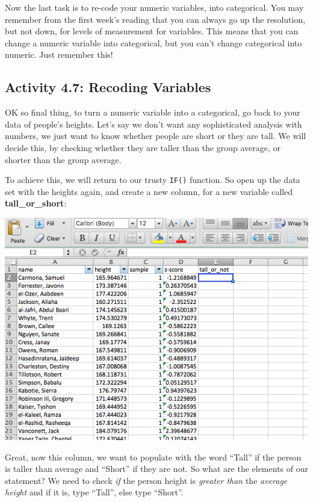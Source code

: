 \documentclass[
]{book}
\begin{document}
Now the last task is to re-code your numeric variables, into categorical. You may remember from the first week's reading that you can always go up the resolution, but not down, for levels of measurement for variables. This means that you can change a numeric variable into categorical, but you can't change categorical into numeric. Just remember this!

\hypertarget{activity-4.7-recoding-variables}{%
\subsection{Activity 4.7: Recoding Variables}\label{activity-4.7-recoding-variables}}

OK so final thing, to turn a numeric variable into a categorical, go back to your data of people's heights. Let's say we don't want any sophisticated analysis with numbers, we just want to know whether people are short or they are tall. We will decide this, by checking whether they are taller than the group average, or shorter than the group average.

To achieve this, we will return to our trusty \texttt{IF()} function. So open up the data set with the heights again, and create a new column, for a new variable called \textbf{tall\_or\_short}:

\includegraphics{imgs/tall_or_not_col.png}

Great, now this column, we want to populate with the word ``Tall'' if the person is taller than average and ``Short'' if they are not. So what are the elements of our statement? We need to check \emph{if} the person height is \emph{greater than} the \emph{average height} and if it is, type ``Tall'', else type ``Short''.
\end{document}
